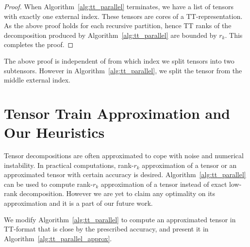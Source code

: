 \documentclass[runningheads]{llncs}
\begin{document}
\begin{proof}
	When Algorithm~\ref{alg:tt_parallel} terminates, we have a list of tensors with exactly one external index. These tensors are cores of a TT-representation. As the above proof holds for each recursive partition, hence TT ranks of the decomposition produced by Algorithm~\ref{alg:tt_parallel} are bounded by $r_k$. This completes the proof.
\end{proof}

\indent The above proof is independent of from which index we split tensors into two subtensors. However in Algorithm~\ref{alg:tt_parallel}, we split the tensor from the middle external index.


\section{Tensor Train Approximation and Our Heuristics}
\label{sec:heuristics}


Tensor decompositions are often approximated to cope with noise and numerical instability. In practical computations, rank-$r_k$ approximation of a tensor or an approximated tensor with certain accuracy is desired. Algorithm~\ref{alg:tt_parallel} can be used to compute rank-$r_k$ approximation of a tensor instead of exact low-rank decomposition. However we are yet to claim any optimality on its approximation and it is a part of our future work.

We modify Algorithm~\ref{alg:tt_parallel} to compute an approximated tensor in TT-format that is close by the prescribed accuracy, and present it in Algorithm~\ref{alg:tt_parallel_approx}.
 
\end{document}
